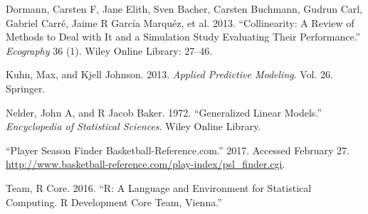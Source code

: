 \documentclass[]{elsarticle} %
\begin{document}
\hypertarget{ref-dormann2013collinearity}{}
Dormann, Carsten F, Jane Elith, Sven Bacher, Carsten Buchmann, Gudrun
Carl, Gabriel Carré, Jaime R García Marquéz, et al. 2013.
``Collinearity: A Review of Methods to Deal with It and a Simulation
Study Evaluating Their Performance.'' \emph{Ecography} 36 (1). Wiley
Online Library: 27--46.

\hypertarget{ref-kuhn2013applied}{}
Kuhn, Max, and Kjell Johnson. 2013. \emph{Applied Predictive Modeling}.
Vol. 26. Springer.

\hypertarget{ref-nelder1972generalized}{}
Nelder, John A, and R Jacob Baker. 1972. ``Generalized Linear Models.''
\emph{Encyclopedia of Statistical Sciences}. Wiley Online Library.

\hypertarget{ref-BR_2}{}
``Player Season Finder Basketball-Reference.com.'' 2017. Accessed
February 27.
\url{http://www.basketball-reference.com/play-index/psl_finder.cgi}.

\hypertarget{ref-team2016r}{}
Team, R Core. 2016. ``R: A Language and Environment for Statistical
Computing. R Development Core Team, Vienna.''
\end{document}
